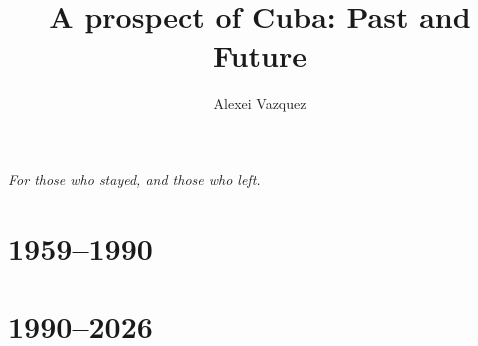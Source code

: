 \documentclass[10pt]{book}
\begin{document}
\frontmatter

\title{A prospect of Cuba: Past and Future}
\author{Alexei Vazquez}
\date{}
\maketitle

\thispagestyle{empty}
\vspace*{\fill}
\begin{center}
{\itshape For those who stayed, and those who left.}
\end{center}
\vspace*{\fill}
\clearpage




\setcounter{tocdepth}{0}
\tableofcontents

\mainmatter

\part{1959--1990}







\part{1990--2026}
\end{document}
